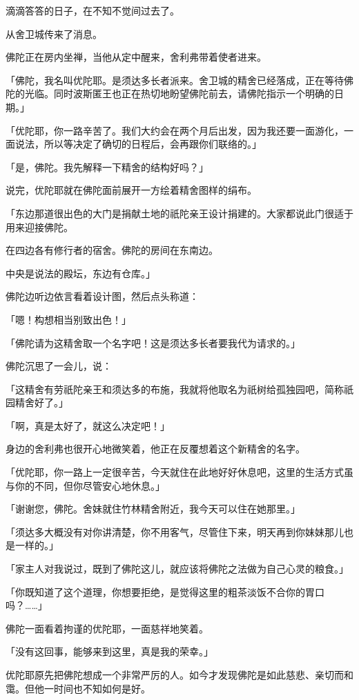 \documentclass[twoside,openany]{book}
\begin{document}
滴滴答答的日子，在不知不觉间过去了。

从舍卫城传来了消息。

佛陀正在房内坐禅，当他从定中醒来，舍利弗带着使者进来。

「佛陀，我名叫优陀耶。是须达多长者派来。舍卫城的精舍已经落成，正在等待佛陀的光临。同时波斯匿王也正在热切地盼望佛陀前去，请佛陀指示一个明确的日期。」

「优陀耶，你一路辛苦了。我们大约会在两个月后出发，因为我还要一面游化，一面说法，所以等决定了确切的日程后，会再跟你们联络的。」

「是，佛陀。我先解释一下精舍的结构好吗？」

说完，优陀耶就在佛陀面前展开一方绘着精舍图样的绢布。

「东边那道很出色的大门是捐献土地的祇陀亲王设计捐建的。大家都说此门很适于用来迎接佛陀。

在四边各有修行者的宿舍。佛陀的房间在东南边。

中央是说法的殿坛，东边有仓库。」

佛陀边听边依言看着设计图，然后点头称道：

「嗯！构想相当别致出色！」

「佛陀请为这精舍取一个名字吧！这是须达多长者要我代为请求的。」

佛陀沉思了一会儿，说：

「这精舍有劳祇陀亲王和须达多的布施，我就将他取名为祇树给孤独园吧，简称祇园精舍好了。」

「啊，真是太好了，就这么决定吧！」

身边的舍利弗也很开心地微笑着，他正在反覆想着这个新精舍的名字。

「优陀耶，你一路上一定很辛苦，今天就住在此地好好休息吧，这里的生活方式虽与你的不同，但你尽管安心地休息。」

「谢谢您，佛陀。舍妹就住竹林精舍附近，我今天可以住在她那里。」

「须达多大概没有对你讲清楚，你不用客气，尽管住下来，明天再到你妹妹那儿也是一样的。」

「家主人对我说过，既到了佛陀这儿，就应该将佛陀之法做为自己心灵的粮食。」

「你既知道了这个道理，你想要拒绝，是觉得这里的粗茶淡饭不合你的胃口吗？……」

佛陀一面看着拘谨的优陀耶，一面慈祥地笑着。

「没有这回事，能够来到这里，真是我的荣幸。」

优陀耶原先把佛陀想成一个非常严厉的人。如今才发现佛陀是如此慈悲、亲切而和霭。但他一时间也不知如何是好。
\end{document}
